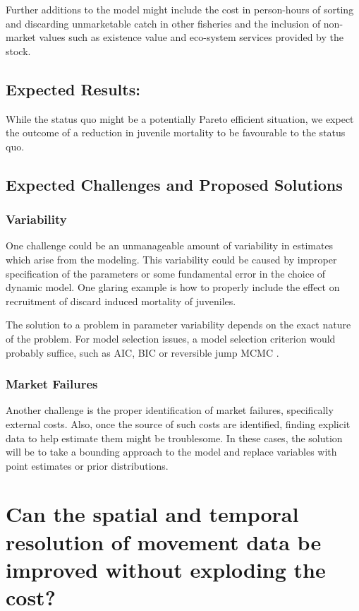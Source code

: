 \documentclass{article}
\begin{document}
Further additions to the model might include the cost in person-hours of sorting and discarding unmarketable catch in other fisheries and the inclusion of non-market values such as existence value and eco-system services provided by the stock.

\subsection{Expected Results:} 

While the status quo might be a potentially Pareto efficient situation, we expect the outcome of a reduction in juvenile mortality to be favourable to the status quo.

\subsection{Expected Challenges and Proposed Solutions}

\subsubsection*{Variability}

One challenge could be an unmanageable amount of variability in estimates which arise from the modeling. This variability could be caused by improper specification of the parameters or some fundamental error in the choice of dynamic model. One glaring example is how to properly include the effect on recruitment of discard induced mortality of juveniles.

The solution to a problem in parameter variability depends on the exact nature of the problem. For model selection issues, a model selection criterion would probably suffice, such as AIC, BIC or reversible jump MCMC \citep{gelman2014bayesian}. 

\subsubsection*{Market Failures}

Another challenge is the proper identification of market failures, specifically external costs. Also, once the source of such costs are identified, finding explicit data to help estimate them might be troublesome. In these cases, the solution will be to take a bounding approach to the model and replace variables with point estimates or prior distributions.


\section{Can the spatial and temporal resolution of movement data be improved without exploding the cost?}\label{sec:PowSim}
\end{document}
